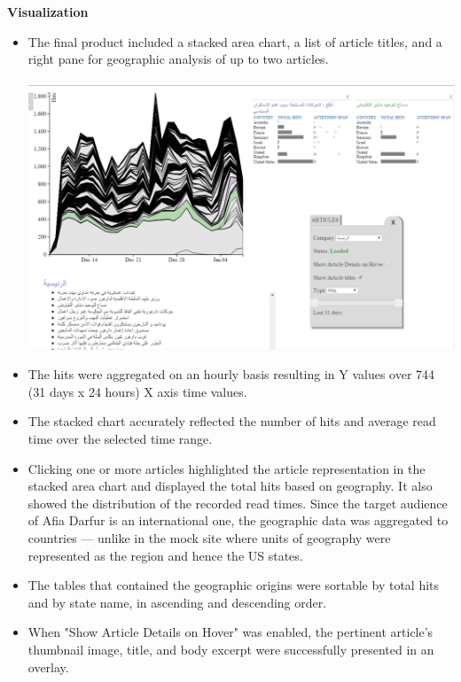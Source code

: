 \documentclass[12pt]{article}
\begin{document}
{\noindent\textbf{Visualization} 
\begin{itemize}
\item The final product included a stacked area chart, a list of article titles, and a right pane for geographic analysis of up to two articles.
\\ \\
\noindent\includegraphics[scale=0.5]{img/afiadarfur_main_viz} \\
\item The hits were aggregated on an hourly basis resulting in Y values over 744 (31 days x 24 hours) X axis time values.
\item The stacked chart accurately reflected the number of hits and average read time over the selected time range.
\item Clicking one or more articles highlighted the article representation in the stacked area chart and displayed the total hits based on geography. It also showed the distribution of the recorded read times. Since the target audience of Afia Darfur is an international one, the geographic data was aggregated to countries --- unlike in the mock site where units of geography were represented as the region and hence the  US states.
\item The tables that contained the geographic origins were sortable by total hits and by state name, in ascending and descending order.
\item When "Show Article Details on Hover" was enabled, the pertinent article's thumbnail image, title, and body excerpt were successfully presented in an overlay. \\ \\

\end{itemize}}
\end{document}
